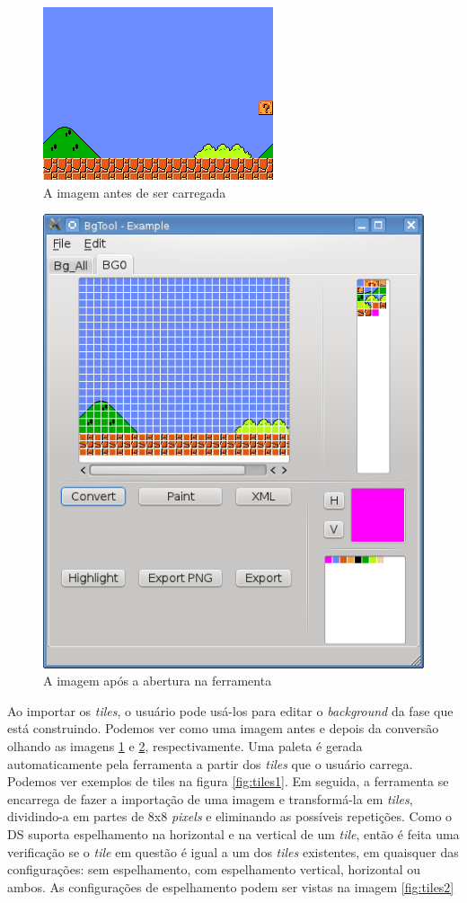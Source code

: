 \documentclass[brazil]{abnt}
\begin{document}
\begin{figure}[h!]
\centering
\includegraphics[scale=1]{imgs/exemplo.png}
\caption{A imagem antes de ser carregada}
\label{fig:exemplo}
\end{figure}

\begin{figure}[h!]
\centering
\includegraphics[scale=1]{imgs/bgtool1.png}
\caption{A imagem após a abertura na ferramenta}
\label{fig:bgtool1}
\end{figure}

Ao importar os \textit{tiles}, o usuário pode usá-los para editar o \textit{background} da fase que está construindo. Podemos ver como uma imagem antes e depois da conversão olhando as imagens \ref{fig:exemplo} e \ref{fig:bgtool1}, respectivamente. Uma paleta é gerada automaticamente pela ferramenta a partir dos \textit{tiles} que o usuário carrega. Podemos ver exemplos de tiles na figura \ref{fig:tiles1}. Em seguida, a ferramenta se encarrega de fazer a importação de uma imagem e transformá-la em \textit{tiles}, dividindo-a em partes de 8x8 \textit{pixels} e eliminando as possíveis repetições. Como o DS suporta espelhamento na horizontal e na vertical de um \textit{tile}, então é feita uma verificação se o \textit{tile} em questão é igual a um dos \textit{tiles} existentes, em quaisquer das configurações: sem espelhamento, com espelhamento vertical, horizontal ou ambos. As configurações de espelhamento podem ser vistas na imagem \ref{fig:tiles2}
\end{document}
